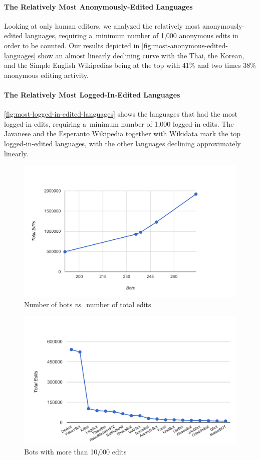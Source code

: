 \documentclass{sig-alternate}
\begin{document}
\paragraph{The Relatively Most Anonymously-Edited Languages}

Looking at only human editors, we analyzed the relatively
most anonymously-edited languages, requiring a~minimum
number of 1,000 anonymous edits in order to be counted.
Our results depicted in \autoref{fig:most-anonymous-edited-languages}
show an almost linearly declining curve with the Thai,
the Korean, and the Simple English Wikipedias being at the top
with 41\% and two times 38\% anonymous editing activity. 

\paragraph{The Relatively Most Logged-In-Edited Languages}

\autoref{fig:most-logged-in-edited-languages} shows
the languages that had the most logged-in edits,
requiring a~minimum number of 1,000 logged-in edits.
The Javanese and the Esperanto Wikipedia together with Wikidata
mark the top logged-in-edited languages,
with the other languages declining approximately linearly.

\begin{figure}[p]
  \center
  \includegraphics[width=0.84\linewidth]{bots-total-edits.pdf}
  \caption{Number of bots \emph{vs.}\ number of total edits}
  \label{fig:bots-total-edits}
\end{figure}

\begin{figure}[p]
  \center
  \includegraphics[width=\linewidth]{most-active-bots.pdf}
  \caption{Bots with more than 10,000 edits}
  \label{fig:most-active-bots}
\end{figure}
\end{document}
